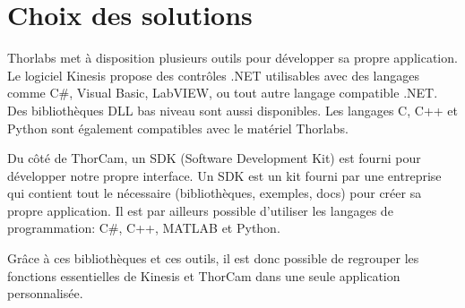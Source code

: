 \section{Choix des solutions}
Thorlabs met à disposition plusieurs outils pour développer sa propre application. Le logiciel Kinesis propose des contrôles .NET utilisables avec des langages comme C\#, Visual Basic, LabVIEW, ou tout autre langage compatible .NET. Des bibliothèques DLL bas niveau sont aussi disponibles. Les langages C, C++ et Python sont également compatibles avec le matériel Thorlabs.

Du côté de ThorCam, un SDK (Software Development Kit) est fourni pour développer notre propre interface. Un SDK est un kit fourni par une entreprise qui contient tout le nécessaire (bibliothèques, exemples, docs) pour créer sa propre application. Il est par ailleurs possible d'utiliser les langages de programmation: C\#, C++, MATLAB et Python.

Grâce à ces bibliothèques et ces outils, il est donc possible de regrouper les fonctions essentielles de Kinesis et ThorCam dans une seule application personnalisée.

